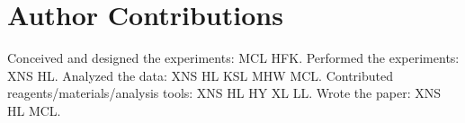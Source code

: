 \documentclass[10pt,letterpaper]{article}
\begin{document}
\section*{Author Contributions}

Conceived and designed the experiments: MCL HFK. Performed the experiments: XNS HL. Analyzed the data: XNS HL KSL MHW MCL. Contributed reagents/materials/analysis tools: XNS HL HY XL LL. Wrote the paper: XNS HL MCL.

\nolinenumbers

%
%
% 




\end{document}
